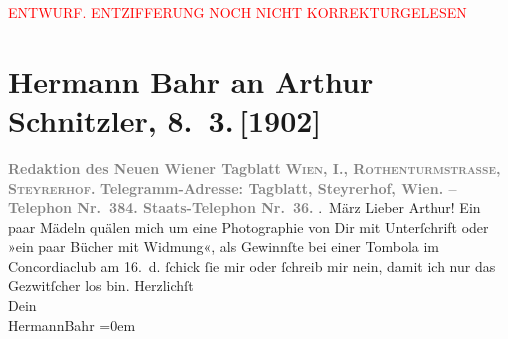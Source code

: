 
\begin{center}
            \textcolor{red}{ENTWURF. ENTZIFFERUNG NOCH NICHT KORREKTURGELESEN}
                      \end{center}
            
               \section[Hermann Bahr an Arthur Schnitzler, 8. 3. {[}1902{]}]{ Hermann Bahr an Arthur Schnitzler, 8. 3. {[}1902{]}}\nopagebreak{}\rehead{ }\begin{ledgroupsized}[t]{13cm}\normalsize\beginnumbering{} \toendnotes[C]{\smallbreak\pagebreak[2]} 
\pstart
           \noindent{}\centering{}{\pb}\textcolor{gray}{\textbf{Redaktion des Neuen Wiener
                           Tagblatt}}\pend
           \pstart
           \noindent{}\centering{}\textcolor{gray}{\textbf{\textsc{Wien, I., Rothenturmstrasse,
                        Steyrerhof.}}}\pend
           \pstart
           \noindent{}\centering{}\textcolor{gray}{\textbf{Telegramm-Adresse: Tagblatt, Steyrerhof, Wien. –
                     Telephon Nr. 384. Staats-Telephon Nr. 36.}}\pend
           . März\pend
           \pstart\center{}Lieber Arthur!\pend\pstart
           Ein paar Mädeln quälen mich um eine Photographie von Dir mit Unterſchrift oder »ein
               paar Bücher mit Widmung«, als Gewinnſte bei einer Tombola im Concordiaclub am 16. d.{ }ſchick ſie mir oder
               ſchreib mir nein, damit ich nur das Gezwitſcher los bin.\pend
           \pstart
           Herzlichſt{\\[\baselineskip]}Dein{\\[\baselineskip]}\spacefill\mbox{HermannBahr}\pend
           \leftskip=0em{}\endnumbering{}\end{ledgroupsized}  \newcommand{\dateiname}{L01207}\newcommand{\titel}{Hermann Bahr an Arthur Schnitzler, 8. 3. [1902]}\newcommand{\editorInnen}{ Kurt Ifkovits,  Martin Anton Müller}
      